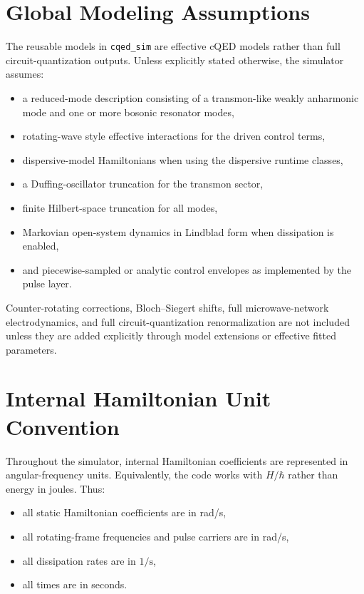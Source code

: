\documentclass[11pt]{article}
\begin{document}
\section{Global Modeling Assumptions}
The reusable models in \texttt{cqed\_sim} are effective cQED models rather than
full circuit-quantization outputs. Unless explicitly stated otherwise, the
simulator assumes:
\begin{itemize}[leftmargin=1.5em]
  \item a reduced-mode description consisting of a transmon-like weakly
  anharmonic mode and one or more bosonic resonator modes,
  \item rotating-wave style effective interactions for the driven control terms,
  \item dispersive-model Hamiltonians when using the dispersive runtime classes,
  \item a Duffing-oscillator truncation for the transmon sector,
  \item finite Hilbert-space truncation for all modes,
  \item Markovian open-system dynamics in Lindblad form when dissipation is enabled,
  \item and piecewise-sampled or analytic control envelopes as implemented by the pulse layer.
\end{itemize}

\noindent
Counter-rotating corrections, Bloch--Siegert shifts, full microwave-network
electrodynamics, and full circuit-quantization renormalization are not included
unless they are added explicitly through model extensions or effective fitted
parameters.

\section{Internal Hamiltonian Unit Convention}
Throughout the simulator, internal Hamiltonian coefficients are represented in
angular-frequency units. Equivalently, the code works with \(H/\hbar\) rather
than energy in joules. Thus:
\begin{itemize}[leftmargin=1.5em]
  \item all static Hamiltonian coefficients are in rad/s,
  \item all rotating-frame frequencies and pulse carriers are in rad/s,
  \item all dissipation rates are in \(1/\mathrm{s}\),
  \item all times are in seconds.
\end{itemize}
\end{document}
